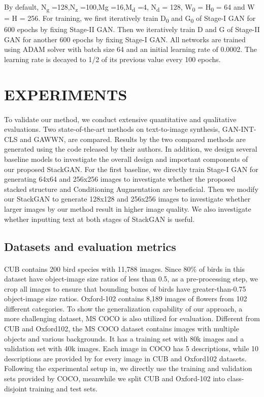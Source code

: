 \documentclass[a4paper,12pt,oneside]{article}
\begin{document}
By default, N\textsubscript{g} =128,N\textsubscript{z} =100,Mg =16,M\textsubscript{d} =4, N\textsubscript{d} = 128, W\textsubscript{0} = H\textsubscript{0} = 64 and W = H = 256. For training, we first iteratively train D\textsubscript{0} and G\textsubscript{0} of Stage-I GAN for 600 epochs by fixing Stage-II GAN. Then we iteratively train D and G of Stage-II GAN for another 600 epochs by fixing Stage-I GAN. All networks are trained using ADAM solver with batch size 64 and an initial learning rate of 0.0002. The learning rate is decayed to 1/2 of its previous value every 100 epochs. 

\newpage
\section{EXPERIMENTS}
\paragraph{}
To validate our method, we conduct extensive quantitative and qualitative evaluations. Two state-of-the-art methods on text-to-image synthesis, GAN-INT-CLS and GAWWN, are compared. Results by the two compared methods are generated using the code released by their authors. In addition, we design several baseline models to investigate the overall design and important components of our proposed StackGAN. For the first baseline, we directly train Stage-I GAN for generating 64x64 and 256x256 images to investigate whether the proposed stacked structure and Conditioning Augmentation are beneficial. Then we modify our StackGAN to generate 128x128 and 256x256 images to investigate whether larger images by our method result in higher image quality. We also investigate whether inputting text at both stages of StackGAN is useful. 

\subsection{Datasets and evaluation metrics }
\paragraph{}

CUB contains 200 bird species with 11,788 images. Since 80\% of birds in this dataset have object-image size ratios of less than 0.5, as a pre-processing step, we crop all images to ensure that bounding boxes of birds have greater-than-0.75 object-image size ratios. Oxford-102 contains 8,189 images of flowers from 102 different categories. To show the generalization capability of our approach, a more challenging dataset, MS COCO is also utilized for evaluation. Different from CUB and Oxford102, the MS COCO dataset contains images with multiple objects and various backgrounds. It has a training set with 80k images and a validation set with 40k images. Each image in COCO has 5 descriptions, while 10 descriptions are provided by for every image in CUB and Oxford102 datasets. Following the experimental setup in, we directly use the training and validation sets provided by COCO, meanwhile we split CUB and Oxford-102 into class-disjoint training and test sets. 
\end{document}
